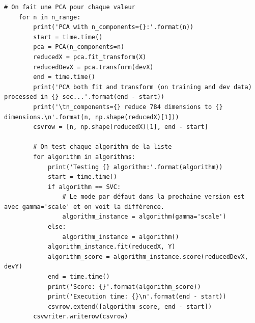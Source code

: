 \documentclass[12pt,a4paper]{article}
\begin{document}
{\begin{lstlisting}[style=darkula]
	# On fait une PCA pour chaque valeur
	for n in n_range:
		print('PCA with n_components={}:'.format(n))
		start = time.time()
		pca = PCA(n_components=n)
		reducedX = pca.fit_transform(X)
		reducedDevX = pca.transform(devX)
		end = time.time()
		print('PCA both fit and transform (on training and dev data) processed in {} sec...'.format(end - start))
		print('\tn_components={} reduce 784 dimensions to {} dimensions.\n'.format(n, np.shape(reducedX)[1]))
		csvrow = [n, np.shape(reducedX)[1], end - start]
		
		# On test chaque algorithm de la liste
		for algorithm in algorithms:
			print('Testing {} algorithm:'.format(algorithm))
			start = time.time()
			if algorithm == SVC:
				# Le mode par défaut dans la prochaine version est avec gamma='scale' et on voit la différence.
				algorithm_instance = algorithm(gamma='scale')
			else:
				algorithm_instance = algorithm()
			algorithm_instance.fit(reducedX, Y)
			algorithm_score = algorithm_instance.score(reducedDevX, devY)
			end = time.time()
			print('Score: {}'.format(algorithm_score))
			print('Execution time: {}\n'.format(end - start))
			csvrow.extend([algorithm_score, end - start])
		csvwriter.writerow(csvrow)
\end{lstlisting}

}
\end{document}
